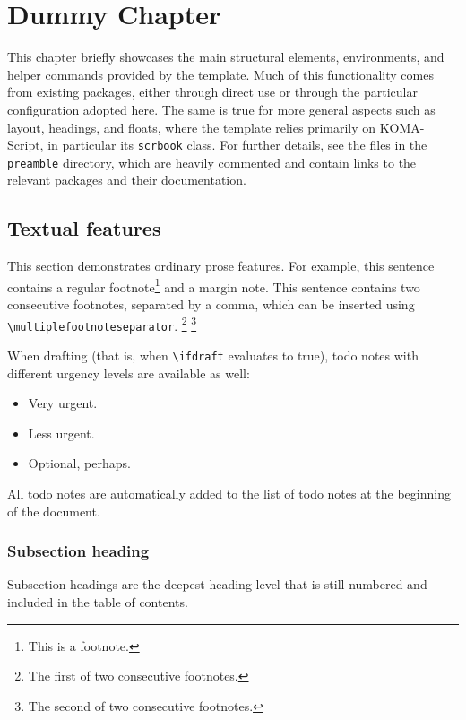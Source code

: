\chapter{Dummy Chapter}\label{main:dummy}

This chapter briefly showcases the main structural elements, environments, and
helper commands provided by the template. Much of this functionality comes from
existing packages, either through direct use or through the particular
configuration adopted here. The same is true for more general aspects such as
layout, headings, and floats, where the template relies primarily on
KOMA-Script, in particular its \texttt{scrbook} class. For further details, see
the files in the \texttt{preamble} directory, which are heavily commented and
contain links to the relevant packages and their documentation.

\section{Textual features}\label{main:dummy:text}

This section demonstrates ordinary prose features. For example, this sentence
contains a regular footnote\footnote{This is a footnote.} and a margin
note. This sentence contains two
consecutive footnotes, separated by a comma, which can be inserted using
\verb|\multiplefootnoteseparator|.%
\footnote{The first of two consecutive footnotes.}\multiplefootnoteseparator%
\footnote{The second of two consecutive footnotes.}

When drafting (that is, when \verb|\ifdraft| evaluates to true), todo notes with
different urgency levels are available as well:
\begin{itemize}
\item Very urgent.

\item Less urgent.

\item Optional, perhaps.
\end{itemize}

All todo notes are automatically added to the list of todo notes at the
beginning of the document.

\subsection{Subsection heading}\label{main:dummy:text:sectioning} Subsection
headings are the deepest heading level that is still numbered and included in
the table of contents.

